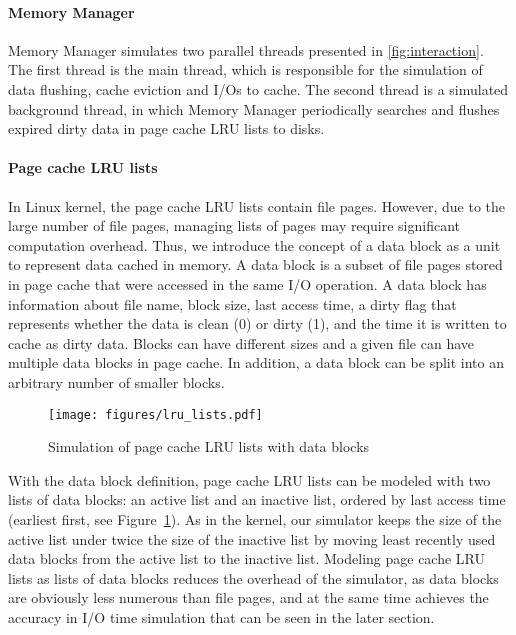 \documentclass[conference]{IEEEtran}
\begin{document}
			\paragraph*{Memory Manager}
			Memory Manager simulates two parallel threads presented in \ref{fig:interaction}.
			The first thread is the main thread, which is responsible for the simulation 
			of data flushing, cache eviction and I/Os to cache. 
			The second thread is a simulated background thread, in which Memory Manager 
			periodically searches and flushes expired dirty data in page cache LRU lists 
			to disks. 

			\paragraph*{Page cache LRU lists}
			In Linux kernel, the page cache LRU lists contain file pages. However, 
			due to the large number of file pages, managing lists of pages may 
			require significant computation overhead. 
			Thus, we introduce the concept of a data block as a unit to represent data 
			cached in memory. A data block is a subset of file pages stored in
            page cache that were accessed in the same I/O operation. 
			A data block has information about file name, block size, last access 
			time, a dirty flag that represents whether the data is clean (0) 
			or dirty (1), and the time it is written to cache as dirty data. 
			Blocks can have different sizes and a given file can have multiple 
			data blocks in page cache. In addition, a data block can be split into an 
			arbitrary number of smaller blocks.

			\begin{figure}
   				\centering
   				\texttt{[image: figures/lru\_lists.pdf]}
   				\caption{Simulation of page cache LRU lists with data blocks}	\label{fig:lrulist}
			\end{figure}	
			
			With the data block definition, page cache LRU lists can be modeled with 
			two lists of data blocks: an active list and an inactive list, ordered by 
			last access time (earliest first, see Figure~\ref{fig:lrulist}).
			As in the kernel, our simulator keeps the size of the active list under
			twice the size of the inactive list by moving least recently 
            used data blocks from the active list to the inactive list.
			Modeling page cache LRU lists as lists of data blocks reduces the
			overhead of the simulator, as data blocks are obviously less
			numerous than file pages, and at the same time achieves the accuracy in 
			I/O time simulation that can be seen in the later section.
			
\end{document}
